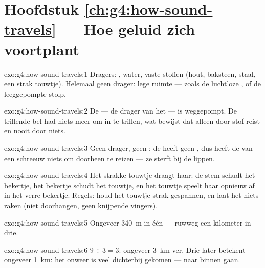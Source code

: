 \section*{Hoofdstuk \ref{ch:g4:how-sound-travels} --- Hoe geluid zich voortplant}

\begin{solution}{exo:g4:how-sound-travels:1}
Dragers: , water, vaste stoffen (hout, baksteen, staal, een
strak touwtje). Helemaal geen drager: lege ruimte --- zoals de
luchtloze , of de leeggepompte stolp.
\end{solution}

\begin{solution}{exo:g4:how-sound-travels:2}
De  --- de drager van het  --- is weggepompt. De trillende
bel had niets meer om in te trillen, wat bewijst dat  alleen
door stof reist en nooit door niets.
\end{solution}

\begin{solution}{exo:g4:how-sound-travels:3}
Geen drager, geen : de  heeft geen , dus heeft de
 van een schreeuw niets om doorheen te reizen --- ze sterft
bij de lippen.
\end{solution}

\begin{solution}{exo:g4:how-sound-travels:4}
Het strakke touwtje draagt haar: de stem schudt het bekertje, het
bekertje schudt het touwtje, en het touwtje speelt haar opnieuw af in
het verre bekertje. Regels: houd het touwtje strak gespannen, en laat
het niets raken (niet doorhangen, geen knijpende vingers).
\end{solution}

\begin{solution}{exo:g4:how-sound-travels:5}
Ongeveer \qty{340}{m} in één  --- ruwweg een kilometer in
drie.
\end{solution}

\begin{solution}{exo:g4:how-sound-travels:6}
$9 \div 3 = 3$: ongeveer \qty{3}{km} ver. Drie  later
betekent ongeveer \qty{1}{km}: het onweer is veel dichterbij gekomen
--- naar binnen gaan.
\end{solution}

